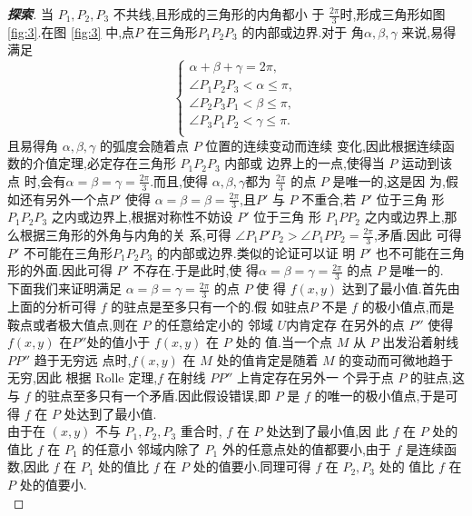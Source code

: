 \documentclass[a4paper]{article}
\begin{document}
\begin{proof}[\textbf{探索}]
当 $P_1,P_2,P_3$ 不共线,且形成的三角形的内角都小
于 $\frac{2\pi}{3}$时,形成三角形如图 \eqref{fig:3}.在图 \eqref{fig:3}
中,点$P$ 在三角形$P_{1}P_{2}P_{3}$ 的内部或边界.对于
角$\alpha,\beta,\gamma$ 来说,易得满足
$$
\begin{cases}
  \alpha+\beta+\gamma=2\pi,\\
  \angle P_1P_{2}P_{3}< \alpha\leq \pi,\\
  \angle P_2P_{3}P_{1}< \beta\leq \pi,\\
  \angle P_3P_{1}P_{2}< \gamma\leq \pi.\\
\end{cases}
$$
且易得角 $\alpha,\beta,\gamma$ 的弧度会随着点 $P$ 位置的连续变动而连续
变化,因此根据连续函数的介值定理,必定存在三角形 $P_{1}P_{2}P_{3}$ 内部或
边界上的一点,使得当 $P$ 运动到该点
时,会有$\alpha=\beta=\gamma=\frac{2\pi}{3}$.而且,使得
$\alpha,\beta,\gamma$都为 $\frac{2\pi}{3}$ 的点 $P$ 是唯一的,这是因
为,假如还有另外一个点$P'$ 使得 $\alpha=\beta=\beta=\frac{2\pi}{3}$,且$P'$ 与 $P$ 不重合,若 $P'$ 位于三角
形 $P_{1}P_{2}P_3$ 之内或边界上,根据对称性不妨设 $P'$ 位于三角
形 $P_{1}PP_2$ 之内或边界上,那么根据三角形的外角与内角的关
系,可得 $\angle P_1P'P_{2}>\angle P_{1}PP_{2}=\frac{2\pi}{3}$,矛盾.因此
可得 $P'$ 不可能在三角形$P_{1}P_{2}P_3$ 的内部或边界.类似的论证可以证
明 $P'$ 也不可能在三角形的外面.因此可得 $P'$ 不存在.于是此时,使
得$\alpha=\beta=\gamma=\frac{2\pi}{3}$ 的点 $P$ 是唯一的.\\

下面我们来证明满足 $\alpha=\beta=\gamma=\frac{2\pi}{3}$ 的点 $P$ 使
得 $f(x,y)$ 达到了最小值.首先由上面的分析可得 $f$ 的驻点是至多只有一个的.假
如驻点$P$ 不是 $f$ 的极小值点,而是鞍点或者极大值点,则在 $P$ 的任意给定小的
邻域 $U$内肯定存
在另外的点 $P''$ 使得 $f(x,y)$ 在$P''$处的值小于 $f(x,y)$ 在 $P$ 处的
值.当一个点 $M$ 从 $P$ 出发沿着射线 $PP''$ 趋于无穷远
点时,$f(x,y)$ 在 $M$ 处的值肯定是随着 $M$ 的变动而可微地趋于无穷,因此
根据 Rolle 定理,$f$ 在射线 $PP''$ 上肯定存在另外一
个异于点 $P$ 的驻点,这与 $f$ 的驻点至多只有一个矛盾.因此假设错误,即 $P$
是 $f$ 的唯一的极小值点,于是可得 $f$ 在 $P$ 处达到了最小值.\\

由于在 $(x,y)$ 不与 $P_1,P_2,P_3$ 重合时, $f$ 在 $P$ 处达到了最小值,因
此 $f$ 在 $P$ 处的值比 $f$ 在 $P_1$ 的任意小
邻域内除了 $P_1$ 外的任意点处的值都要小,由于 $f$ 是连续函数,因此 $f$
在 $P_1$ 处的值比 $f$ 在 $P$ 处的值要小.同理可得 $f$ 在 $P_2,P_3$ 处的
值比 $f$ 在 $P$ 处的值要小.\\


\end{proof}
\end{document}
